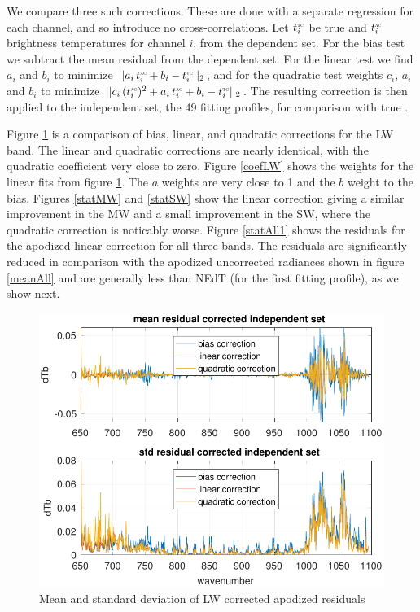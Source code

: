 \documentclass[10pt,twocolumn]{article}
\begin{document}
We compare three such corrections.  These are done with a separate
regression for each {\cris} channel, and so introduce no
cross-correlations.  Let $t^{\mbox{\tiny\textsc{tc}}}_i$ be true {\cris} and $t^{\mbox{\tiny\textsc{ac}}}_i$
{\airs} {\cris} brightness temperatures for {\cris} channel $i$,
from the dependent set.  For the bias test we subtract the mean
residual from the dependent set.  For the linear test we find $a_i$
and $b_i$ to minimize $||a_i\,t^{\mbox{\tiny\textsc{ac}}}_i + b_i - t^{\mbox{\tiny\textsc{tc}}}_i||_2$, and for
the quadratic test weights $c_i$, $a_i$ and $b_i$ to minimize
$||c_i\,(t^{\mbox{\tiny\textsc{ac}}}_i)^2 + a_i\,t^{\mbox{\tiny\textsc{ac}}}_i + b_i - t^{\mbox{\tiny\textsc{tc}}}_i||_2$.  The resulting
correction is then applied to the independent set, the 49 fitting
profiles, for comparison with true {\cris}.

Figure \ref{statLW} is a comparison of bias, linear, and quadratic
corrections for the LW band.  The linear and quadratic corrections
are nearly identical, with the quadratic coefficient very close to
zero.  Figure \ref{coefLW} shows the weights for the linear fits
from figure \ref{statLW}.  The $a$ weights are very close to 1 and
the $b$ weight to the bias.  Figures \ref{statMW} and \ref{statSW}
show the linear correction giving a similar improvement in the MW
and a small improvement in the SW, where the quadratic correction is
noticably worse.  Figure \ref{statAll1} shows the residuals for the
apodized linear correction for all three bands.  The residuals are
significantly reduced in comparison with the apodized uncorrected
radiances shown in figure \ref{meanAll} and are generally less than
NEdT (for the first fitting profile), as we show next.

\begin{figure} %
  \centering
  \includegraphics[width=\linewidth]{figures/a2cris_regr_LW.pdf}
  \caption{Mean and standard deviation of LW corrected apodized
    residuals}
  \label{statLW}
\end{figure}
\end{document}
